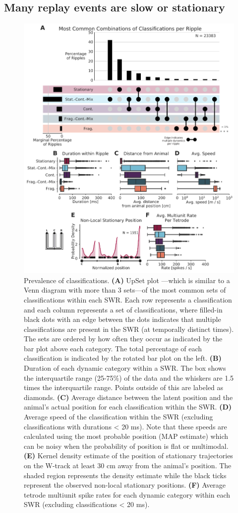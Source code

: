 \documentclass[times, twoside]{zHenriquesLab-StyleBioRxiv}
\begin{document}
\subsection*{Many replay events are slow or stationary}
\begin{figure}%
\centering
\includegraphics[width=0.80\linewidth]{figures/Figure5/Figure5_v4}
\caption{
Prevalence of classifications. \textbf{(A)} UpSet plot \cite{LexUpSetVisualizationIntersecting2014}---which is similar to a Venn diagram with more than 3 sets---of the most common sets of classifications within each SWR. Each row represents a classification and each column represents a set of classifications, where filled-in black dots with an edge between the dots indicates that multiple classifications are present in the SWR (at temporally distinct times). The sets are ordered by how often they occur as indicated by the bar plot above each category. The total percentage of each classification is indicated by the rotated bar plot on the left. \textbf{(B)} Duration of each dynamic category within a SWR. The box shows the interquartile range (25-75\%) of the data and the whiskers are 1.5 times the interquartile range. Points outside of this are labeled as diamonds. \textbf{(C)} Average distance between the latent position and the animal's actual position for each classification within the SWR. \textbf{(D)} Average speed of the classification within the SWR (excluding classifications with durations < 20 ms). Note that these speeds are calculated using the most probable position (MAP estimate) which can be noisy when the probability of position is flat or multimodal.\textbf{(E)} Kernel density estimate of the position of stationary trajectories on the W-track at least 30 cm away from the animal's position. The shaded region represents the density estimate while the black ticks represent the observed non-local stationary positions. \textbf{(F)} Average tetrode multiunit spike rates for each dynamic category within each SWR (excluding classifications < 20 ms).
}
\label{5}
\end{figure}
\end{document}
